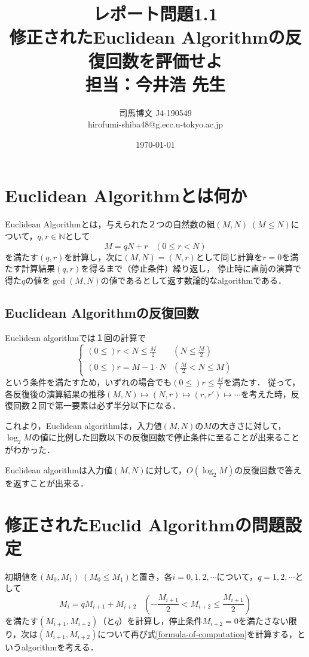 \documentclass[uplatex, dvipdfmx]{jsarticle}
\title{レポート問題1.1\\ 修正されたEuclidean Algorithmの反復回数を評価せよ \\ 担当：今井浩 先生}
\author{司馬博文 J4-190549\\hirofumi-shiba48@g.ecc.u-tokyo.ac.jp}
\date{\today}
\begin{document}
\maketitle

\section{Euclidean Algorithmとは何か}

Euclidean Algorithmとは，与えられた２つの自然数の組$(M,N)\;(M\le N)$について，$q,r\in\mathbb{N}$として
\[ M=qN+r\;\;\; (0\le r<N) \]
を満たす$(q,r)$を計算し，次に$(M,N)=(N,r)$として同じ計算を$r=0$を満たす計算結果$(q,r)$を得るまで（停止条件）繰り返し，
停止時に直前の演算で得た$q$の値を$\gcd(M,N)$の値であるとして返す数論的なalgorithmである．

\subsection{Euclidean Algorithmの反復回数}

Euclidean algorithmでは１回の計算で
\[\begin{cases}
    (0\le)r<N\le \frac{M}{2} & (N\le\frac{M}{2}) \\
    (0\le)r=M-1\cdot N & (\frac{M}{2}<N\le M)
\end{cases}\]
という条件を満たすため，いずれの場合でも$(0\le)r\le \frac{M}{2}$を満たす．
従って，各反復後の演算結果の推移$(M,N)\mapsto (N,r)\mapsto (r,r')\mapsto\cdots$を考えた時，反復回数２回で第一要素は必ず半分以下になる．

これより，Euclidean algorithmは，入力値$(M,N)$の$M$の大きさに対して，$\log_2M$の値に比例した回数以下の反復回数で停止条件に至ることが出来ることがわかった．
\begin{screen}
    Euclidean algorithmは入力値$(M,N)$に対して，$O(\log_2M)$の反復回数で答えを返すことが出来る．
\end{screen}

\section{修正されたEuclid Algorithmの問題設定}

初期値を$(M_0,M_1)\;(M_0\le M_1)$と置き，各$i=0,1,2,\cdots$について，$q=1,2,\cdots$として
\begin{equation}\label{formula-of-computation} M_i=qM_{i+1}+M_{i+2}\;\;\; (-\frac{M_{i+1}}{2}<M_{i+2}\le \frac{M_{i+1}}{2}) \end{equation}
を満たす$(M_{i+1},M_{i+2})$（と$q$）を計算し，停止条件$M_{i+2}=0$を満たさない限り，次は$(M_{i+1}, M_{i+2})$について再び式\ref{formula-of-computation}を計算する，というalgorithmを考える．
\end{document}
